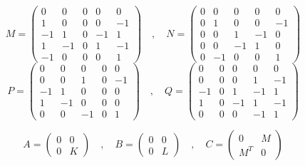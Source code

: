 \documentclass[12pt]{article}
\begin{document}
\begin{displaymath}
M = \left(
\begin{array}{ccccc}
0 & 0 & 0 & 0 & 0 \\
1 & 0 & 0 & 0 & -1 \\
-1 & 1 & 0 & -1 & 1 \\
1 & -1 & 0 & 1 & -1 \\
-1 & 0 & 0 & 0 & 1
\end{array} \right)
\quad , \quad
N = \left(
\begin{array}{ccccc}
0 & 0 & 0 & 0 & 0 \\
0 & 1 & 0 & 0 & -1 \\
0 & 0 & 1 & -1 & 0 \\
0 & 0 & -1 & 1 & 0 \\
0 & -1 & 0 & 0 & 1
\end{array} \right)
\end{displaymath}
\begin{displaymath}
P = \left(
\begin{array}{ccccc}
0 & 0 & 0 & 0 & 0 \\
0 & 0 & 1 & 0 & -1 \\
-1 & 1 & 0 & 0 & 0 \\
1 & -1 & 0 & 0 & 0 \\
0 & 0 & -1 & 0 & 1
\end{array} \right)
\quad , \quad
Q = \left(
\begin{array}{ccccc}
0 & 0 & 0 & 0 & 0 \\
0 & 0 & 0 & 1 & -1 \\
-1 & 0 & 1 & -1 & 1 \\
1 & 0 & -1 & 1 & -1 \\
0 & 0 & 0 & -1 & 1
\end{array} \right)
\end{displaymath}

\begin{displaymath}
A = \left( \begin{array}{cc}
0 & 0 \\
0 & K
\end{array} \right) \quad , \quad
B = \left( \begin{array}{cc}
0 & 0 \\
0 & L
\end{array} \right) \quad , \quad
C = \left( \begin{array}{cc}
0 & M \\
M^T & 0
\end{array} \right)
\end{displaymath}
\end{document}
